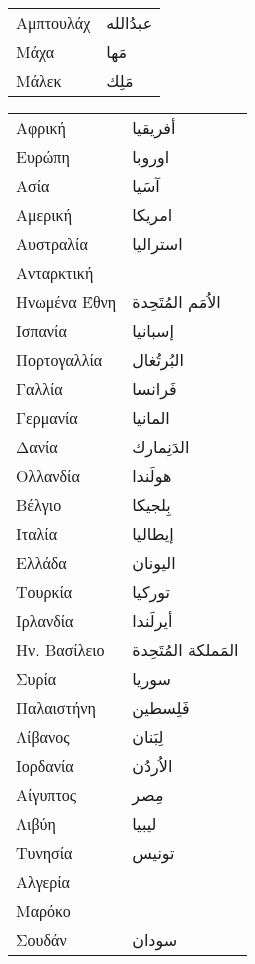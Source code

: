 \documentclass[twocolumn,a4paper]{article}
\newcommand{\ar}[1]{\textarabic{#1}}
\begin{document}
\clearpage

\begin{mpsupertabular}{ P{0.5\textwidth} P{0.5\textwidth} }
Αμπτουλάχ          & \ar{ عبدُالله } \\
Μάχα               & \ar{ مَها } \\
Μάλεκ              & \ar{ مَلِك } \\
\end{mpsupertabular}

\clearpage

\begin{mpsupertabular}{ P{0.5\textwidth} P{0.5\textwidth} }
Αφρική       & \ar{ أفريقيا } \\
Ευρώπη       & \ar{ اوروبا } \\
Ασία         & \ar{ آسَيا } \\
Αμερική      & \ar{ امريكا } \\
Αυστραλία    & \ar{ استراليا } \\
Ανταρκτική   & \ar{  } \\

Ηνωμένα Έθνη & \ar{ اﻻُمَم المُتَحِدة } \\
Ισπανία      & \ar{ إسبانيا } \\
Πορτογαλλία  & \ar{ البُرتُغال } \\
Γαλλία       & \ar{ فَرانسا } \\
Γερμανία     & \ar{ المانيا } \\
Δανία        & \ar{  الدَنِمارك} \\
Ολλανδία     & \ar{ هولَندا } \\
Βέλγιο       & \ar{ بِلجيكا } \\

Ιταλία       & \ar{ إيطاليا } \\
Ελλάδα       & \ar{ اليونان } \\
Τουρκία      & \ar{ توركيا } \\

Ιρλανδία     & \ar{ أيرلَندا } \\
Ην. Βασίλειο & \ar{ المَملكة المُتَحِدة }\\

Συρία        & \ar{ سوريا } \\
Παλαιστήνη   & \ar{ فَلِسطين } \\
Λίβανος      & \ar{ لِبَنان } \\
Ιορδανία     & \ar{ الاُردُن } \\


Αίγυπτος     & \ar{ مِصر } \\
Λιβύη        & \ar{ ليبيا } \\
Τυνησία      & \ar{ تونيس } \\
Αλγερία      & \\  %
Μαρόκο       & \\ %
Σουδάν       & \ar{ سودان } \\



\end{mpsupertabular}
\end{document}
